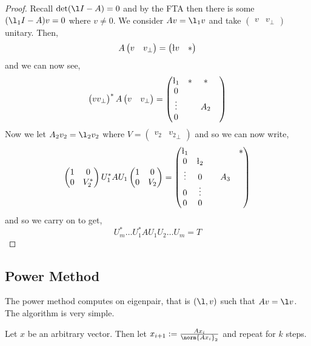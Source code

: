 \begin{proof}
  Recall $\det(\l I - A) = 0$ and by the FTA then there is some $(\l_1 I - A)v = 0$ where $v \ne 0$. We consider $Av = \l_1 v$ and take $\begin{pmatrix}
    v & v_\perp
  \end{pmatrix}$ unitary. Then,
  \begin{align*}
    A \begin{pmatrix}
      v & v_\perp
  \end{pmatrix} &= \begin{pmatrix}
    \l v & *
\end{pmatrix} \\
  \end{align*}
  and we can now see,
  $$ \begin{pmatrix}
    v v_\perp
  \end{pmatrix}^* A \begin{pmatrix}
    v & v_\perp
  \end{pmatrix} = \begin{pmatrix}
    \l_1 & * & * \\
    0 & && \\
    \vdots && A_2& \\
    0 &&&
  \end{pmatrix} $$
  Now we let $A_2v_2 = \l_2 v_2$ where $V = \begin{pmatrix}
    v_2 & {v_2}_{\perp}
  \end{pmatrix}$ and so we can now write,
  $$ \begin{pmatrix}
    1 & 0 \\ 0 & V_2^*
  \end{pmatrix} U_1^* A U_1 \begin{pmatrix}
    1 & 0 \\ 0 & V_2
  \end{pmatrix} = \begin{pmatrix}
    \l_1 & & & & * \\
    0 & \l_2 & & & \\
    \vdots & 0 & & A_3 & \\
    0 & \vdots & & & \\
    0 & 0 & & &
  \end{pmatrix} $$
  and so we carry on to get,
  $$ U_m^* \dots U_1^* A U_1 U_2 \dots U_m = T $$
\end{proof}


\subsection{Power Method}
The power method computes on eigenpair, that is $(\l, v)$ such that $Av = \l v$. The algorithm is very simple.
\begin{algorithm}
  Let $x$ be an arbitrary vector. Then let $x_{i+1} := \frac{Ax_i}{\norm{Ax_i}_2}$ and repeat for $k$ steps.
\end{algorithm}

